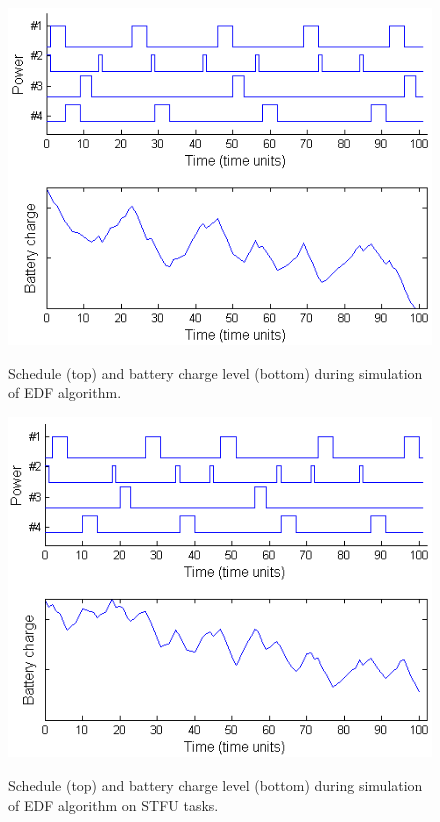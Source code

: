 \begin{figure}[tb]
\begin{center}
\includegraphics[scale=0.57]{edfbattery.png}
\label{fig:edfbattery}
\caption{Schedule (top) and battery charge level (bottom) during simulation of EDF algorithm.}
\end{center}
\end{figure}

\begin{figure}[tb]
\begin{center}
\includegraphics[scale=0.57]{edfstfubattery.png}
\label{fig:edfstfubattery}
\caption{Schedule (top) and battery charge level (bottom) during simulation of EDF algorithm on STFU tasks.}
\end{center}
\end{figure}

